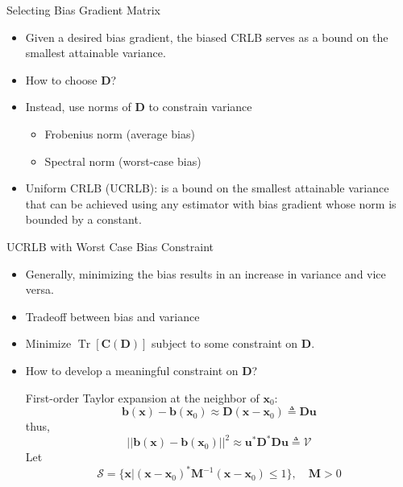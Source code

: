 \documentclass{beamer}
\begin{document}
\begin{frame}{Selecting Bias Gradient Matrix}
  \begin{itemize}
  \item Given a desired bias gradient, the biased CRLB serves as a bound on the smallest attainable variance.
  \item How to choose $\mathbf{D}$?
  \item Instead, use norms of $\mathbf{D}$ to constrain variance
  \begin{itemize}
    \item Frobenius norm (average bias)
    \item Spectral norm (worst-case bias)
  \end{itemize}
  \item Uniform CRLB (UCRLB): is a bound on the smallest attainable
  variance that can be achieved using any estimator with bias gradient whose norm is bounded by a constant.
  \end{itemize}
\end{frame}

\begin{frame}{UCRLB with Worst Case Bias Constraint}
  \begin{itemize}
    \item Generally, minimizing the bias results in an increase in variance and vice versa.
    \item Tradeoff between bias and variance
    \item Minimize $\operatorname{Tr}[\mathbf{C}(\mathbf{D})]$ subject to some constraint on $\mathbf{D}$.
    \item How to develop a meaningful constraint on $\mathbf{D}$?
    
    First-order Taylor expansion at the neighbor of $\mathbf{x}_0$:
    \[
        \mathbf{b}(\mathbf{x}) - \mathbf{b}(\mathbf{x}_0) \approx \mathbf{D}(\mathbf{x} - \mathbf{x}_0) 
        \triangleq \mathbf{D} \mathbf{u}
    \]
    thus,
    \[
        ||\mathbf{b}(\mathbf{x}) - \mathbf{b}(\mathbf{x}_0)||^2 \approx 
        \mathbf{u}^* \mathbf{D}^* \mathbf{D u} 
        \triangleq \mathcal{V}
    \]
    Let
    \[
    \mathcal{S} = 
    \{\mathbf{x}|(\mathbf{x} - \mathbf{x}_0)^*\mathbf{M}^{-1}(\mathbf{x} - \mathbf{x}_0) \leq 1\}, 
    \quad \mathbf{M} > 0
    \]
    
  \end{itemize}
\end{frame}
\end{document}
